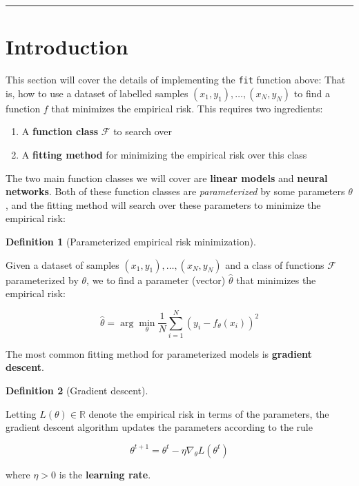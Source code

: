 \documentclass[
  letterpaper,
  DIV=11,
  numbers=noendperiod]{scrreprt}
\providecommand{\tightlist}{%
  \setlength{\itemsep}{0pt}\setlength{\parskip}{0pt}}\usepackage{longtable,booktabs,array}
\theoremstyle{plain}
\theoremstyle{plain}
\theoremstyle{definition}
\theoremstyle{definition}
\newtheorem{definition}{Definition}[chapter]
\theoremstyle{remark}
\begin{document}
\begin{center}\rule{0.5\linewidth}{0.5pt}\end{center}

\section{Introduction}\label{introduction-4}

This section will cover the details of implementing the \texttt{fit}
function above: That is, how to use a dataset of labelled samples
\((x_1, y_1), \dots, (x_N, y_N)\) to find a function \(f\) that
minimizes the empirical risk. This requires two ingredients:

\begin{enumerate}
\def\labelenumi{\arabic{enumi}.}
\tightlist
\item
  A \textbf{function class} \(\mathcal{F}\) to search over
\item
  A \textbf{fitting method} for minimizing the empirical risk over this
  class
\end{enumerate}

The two main function classes we will cover are \textbf{linear models}
and \textbf{neural networks}. Both of these function classes are
\emph{parameterized} by some parameters \(\theta\), and the fitting
method will search over these parameters to minimize the empirical risk:

\begin{definition}[Parameterized empirical risk
minimization]\protect\hypertarget{def-parameterized_empirical_risk_minimization}{}\label{def-parameterized_empirical_risk_minimization}

Given a dataset of samples \((x_1, y_1), \dots, (x_N, y_N)\) and a class
of functions \(\mathcal{F}\) parameterized by \(\theta\), we to find a
parameter (vector) \(\hat \theta\) that minimizes the empirical risk:

\[
\hat \theta = \arg\min_{\theta} \frac{1}{N} \sum_{i=1}^N (y_i - f_\theta(x_i))^2
\]

\end{definition}

The most common fitting method for parameterized models is
\textbf{gradient descent}.

\begin{definition}[Gradient
descent]\protect\hypertarget{def-gd_def}{}\label{def-gd_def}

Letting \(L(\theta) \in \mathbb{R}\) denote the empirical risk in terms
of the parameters, the gradient descent algorithm updates the parameters
according to the rule

\[
\theta^{t+1} = \theta^t - \eta \nabla_\theta L(\theta^t)
\]

where \(\eta > 0\) is the \textbf{learning rate}.

\end{definition}
\end{document}
